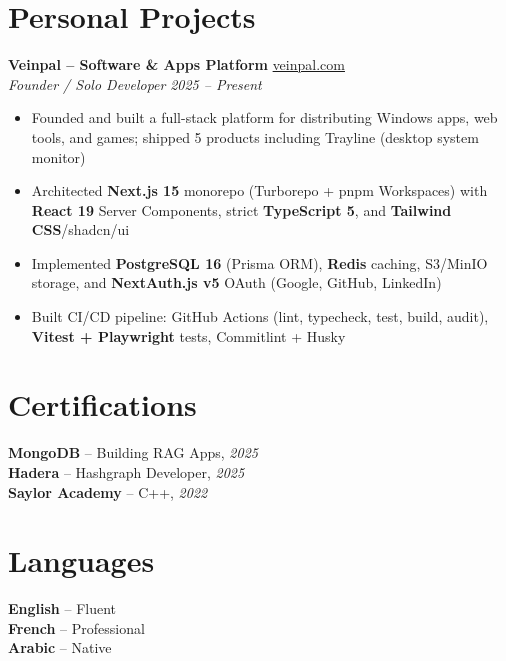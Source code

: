 \documentclass[10pt,a4paper]{article}
\begin{document}
\section*{Personal Projects}
{\small
\textbf{Veinpal -- Software \& Apps Platform} \hfill \href{https://veinpal.com}{veinpal.com}\\[1pt]
\textit{Founder / Solo Developer} \hfill \textit{2025 -- Present}
\begin{itemize}
  \item Founded and built a full-stack platform for distributing Windows apps, web tools, and games; shipped 5 products including Trayline (desktop system monitor)
  \item Architected \textbf{Next.js 15} monorepo (Turborepo + pnpm Workspaces) with \textbf{React 19} Server Components, strict \textbf{TypeScript 5}, and \textbf{Tailwind CSS}/shadcn/ui
  \item Implemented \textbf{PostgreSQL 16} (Prisma ORM), \textbf{Redis} caching, S3/MinIO storage, and \textbf{NextAuth.js v5} OAuth (Google, GitHub, LinkedIn)
  \item Built CI/CD pipeline: GitHub Actions (lint, typecheck, test, build, audit), \textbf{Vitest + Playwright} tests, Commitlint + Husky
\end{itemize}
}

\vspace{4pt}
\section*{Certifications}
{\small
\textbf{MongoDB} -- Building RAG Apps, \textit{2025}\\[1pt]
\textbf{Hadera} -- Hashgraph Developer, \textit{2025}\\[1pt]
\textbf{Saylor Academy} -- C++, \textit{2022}
}

\section*{Languages}
{\small
\textbf{English} -- Fluent\\[1pt]
\textbf{French} -- Professional\\[1pt]
\textbf{Arabic} -- Native
}
\end{document}
